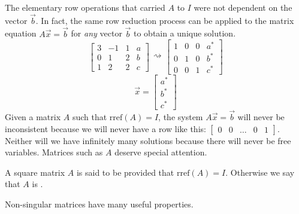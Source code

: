 \documentclass{ximera}
\begin{document}
The elementary row operations that carried $A$ to $I$ were not dependent on the vector $\vec{b}$.  In fact, the same row reduction process can be applied to the matrix equation $A\vec{x}=\vec{b}$ for {\it any} vector $\vec{b}$ to obtain a unique solution.
$$\left[\begin{array}{ccc|c}  
 3&-1&1&a\\0&1&2&b\\1&2&2&c
 \end{array}\right]\begin{array}{c}
 \\
 \rightsquigarrow\\
 \\
 \end{array}\left[\begin{array}{ccc|c}  
 1&0&0&a^*\\0&1&0&b^*\\0&0&1&c^*
 \end{array}\right]$$
 $$\vec{x}=\begin{bmatrix}a^*\\b^*\\c^*\end{bmatrix}$$
Given a matrix $A$ such that $\mbox{rref}(A)=I$, the system $A\vec{x}=\vec{b}$ will never be inconsistent because we will never have a row like this: $\left[\begin{array}{cccc|c}  
 0&0&\ldots&0&1
 \end{array}\right]$.  Neither will we have infinitely many solutions because there will never be free variables.  Matrices such as $A$ deserve special attention.

\begin{definition}\label{def:nonsingularmatrix}
A square matrix $A$ is said to be  provided that $\mbox{rref}(A)=I$.  Otherwise we say that $A$ is .
\end{definition}

Non-singular matrices have many useful properties.
\end{document}
